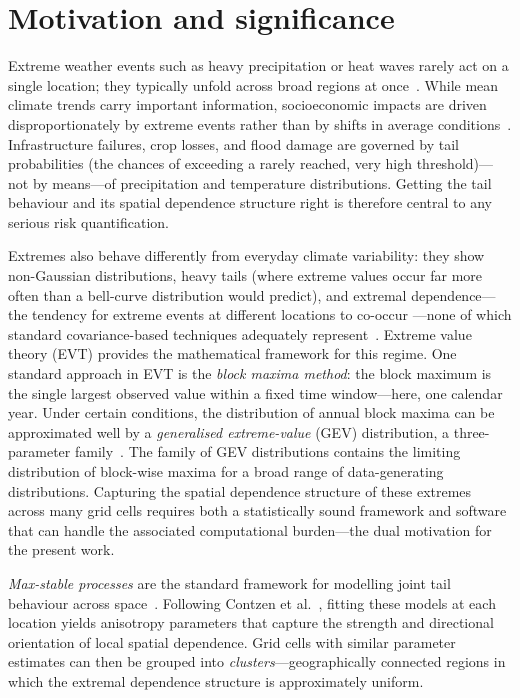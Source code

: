 \documentclass[preprint,12pt,a4paper]{elsarticle}
\newcommand{\revg}[1]{{#1}}
\newcommand{\revt}[1]{{#1}}
\begin{document}
\section{Motivation and significance}
\label{sec:motivation}

Extreme weather events such as heavy precipitation or heat waves
rarely act on a single location; they typically unfold across broad
regions at once~\cite{davison2012}. \revg{While mean climate trends carry important information,
socioeconomic impacts are driven disproportionately by extreme events
rather than by shifts in average conditions~\cite{davison2012}. Infrastructure
failures, crop losses, and flood damage are governed by tail
probabilities (the chances of exceeding a rarely reached, very high
threshold)---not by means---of precipitation and temperature
distributions. Getting the tail behaviour and its spatial dependence
structure right is therefore central to any serious risk
quantification.}

\revg{Extremes also behave differently from everyday climate
variability: they show non-Gaussian distributions, heavy
tails (where extreme values occur far more often than a bell-curve
distribution would predict), and \revt{extremal dependence---the
tendency for extreme events at different locations to co-occur}%
---none of which standard
covariance-based techniques adequately represent~\cite{dehaan2006}. Extreme
value theory (EVT) provides the mathematical framework
for this regime. \revt{One standard approach in EVT is the
\emph{block maxima method}: the block maximum is the single largest
observed value within a fixed time window---here, one calendar year.
Under certain conditions, the distribution
of annual block maxima can be approximated well by a
\emph{generalised extreme-value} (GEV) distribution, a
three-parameter family~\cite{dehaan2006,padoan2010}. The family of GEV distributions contains the limiting
distribution of block-wise maxima for a broad range of data-generating
distributions.} Capturing the
spatial dependence structure of these extremes across many grid
cells requires both a statistically sound framework and software
that can handle the associated computational burden---the dual
motivation for the present work.}

\emph{Max-stable processes} are the standard framework for
modelling joint tail behaviour across space~\cite{dehaan2006,padoan2010}.
Following Contzen et al.~\cite{contzen2025}, fitting these models at each location
yields anisotropy parameters that capture the strength and
directional orientation of local spatial dependence.
Grid cells with similar parameter estimates can then be grouped
into \emph{clusters}---geographically connected regions in which
the extremal dependence structure is approximately uniform.
\end{document}
